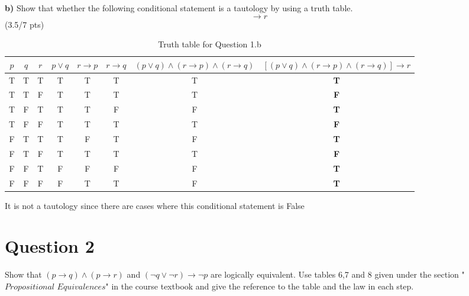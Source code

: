 \documentclass[a4paper,12pt]{article}
\newcommand\tab[1][1cm]{\hspace*{#1}}
\begin{document}
	\tab \textbf{b)} Show that whether the following conditional statement is a tautology by using a truth table.
	\begin{equation*}
	[(p \vee q) \wedge (r \rightarrow p) \wedge (r \rightarrow q)] \rightarrow r
	\end{equation*}
	\hfill \small{(3.5/7 pts)}\\
	\begin{tcolorbox}
		\begin{table}[H]
			\small
			\centering
			\caption{ Truth table for Question 1.b }
			\begin{tabular}{|c|c|c|ccc|c|c|}	
				\hline 
				\textbf{$p$} & \textbf{$q$} & \textbf{$r$} &  \textbf{$p\lor q$} & \textbf{$r\rightarrow p$} & \textbf{$r\rightarrow q$} & $(p\lor q)\land(r\rightarrow p)\land(r\rightarrow q)$ & \textbf{$[(p\lor q)\land(r\rightarrow p)\land(r\rightarrow q)]\rightarrow r$}  \\
				\hline 
				\hline 
				T & T & T & T & T & T & T & \textbf{T} \\ \hline
				T & T & F & T & T & T & T & \textbf{F} \\ \hline
				T & F & T & T & T & F & F & \textbf{T} \\ \hline
				T & F & F & T & T & T & T & \textbf{F} \\ \hline
				F & T & T & T & F & T & F & \textbf{T} \\ \hline
				F & T & F & T & T & T & T & \textbf{F} \\ \hline
				F & F & T & F & F & F & F & \textbf{T} \\ \hline
				F & F & F & F & T & T & F & \textbf{T} \\ \hline
			\end{tabular}
		\end{table}
		It is not a tautology since there are cases where this conditional statement is False
	\end{tcolorbox}
	
	\newpage
	\section*{Question 2 \hfill {}}
	\tab Show that $(p \rightarrow q) \wedge (p \rightarrow r)$ and $(\neg q \vee \neg r)\rightarrow \neg p$ are logically equivalent. Use tables 6,7 and 8 given under the section "$\textit{Propositional Equivalences}$" in the course textbook and give the reference to the table and the law in each step.
	
\end{document}
